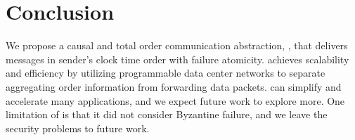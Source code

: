 \section{Conclusion}
\label{sec:conclusion}

We propose a causal and total order communication abstraction, \sys{}, that delivers messages in sender's clock time order with failure atomicity. 
\sys{} achieves scalability and efficiency by utilizing programmable data center networks to separate aggregating order information from forwarding data packets.
\sys{} can simplify and accelerate many applications, and we expect future work to explore more.
One limitation of \sys{} is that it did not consider Byzantine failure, and we leave the security problems to future work.
